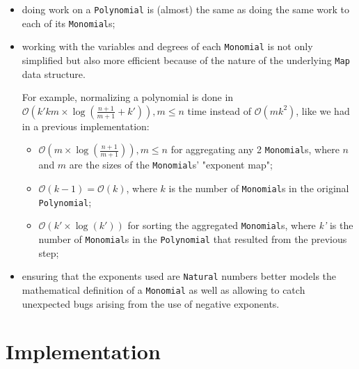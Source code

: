 \documentclass[11pt,a4paper]{article}
\begin{document}
\begin{itemize}
    \item doing work on a \lstinline{Polynomial} is (almost) the same as doing the same work to each of its \lstinline{Monomial}s;

    \item working with the variables and degrees of each \lstinline{Monomial} is not only simplified but also more efficient because of the nature of the underlying \lstinline{Map} data structure.

          For example, normalizing a polynomial is done in $ \mathcal{O} \left( k' k m \times \log \left( \frac{n+1}{m+1} + k' \right) \right), m \leq n $ time instead of $ \mathcal{O} \left( m k^2 \right) $, like we had in a previous implementation:
          \begin{itemize}
              \item $ \mathcal{O} \left( m \times \log \left( \frac{n+1}{m+1} \right) \right), m \leq n $ for aggregating any 2 \lstinline{Monomial}s, where $n$ and $m$ are the sizes of the \lstinline{Monomial}s' "exponent map";

              \item $ \mathcal{O} (k-1) = \mathcal{O} (k) $, where $k$ is the number of \lstinline{Monomial}s in the original \lstinline{Polynomial};

              \item $ \mathcal{O} (k' \times \log(k')) $ for sorting the aggregated \lstinline{Monomial}s, where \textit{k'} is the number of \lstinline{Monomial}s in the \lstinline{Polynomial} that resulted from the previous step;
          \end{itemize}

    \item ensuring that the exponents used are \lstinline{Natural} numbers better models the mathematical definition of a \lstinline{Monomial} as well as allowing to catch unexpected bugs arising from the use of negative exponents.

\end{itemize}

\pagebreak

\section{Implementation}
\end{document}
